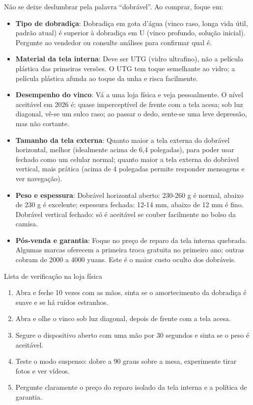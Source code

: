 
Não se deixe deslumbrar pela palavra “dobrável”. Ao comprar, foque em:

\begin{itemize}
  \item \textbf{Tipo de dobradiça}: Dobradiça em gota d'água (vinco raso, longa vida útil, padrão atual) é superior à dobradiça em U (vinco profundo, solução inicial). Pergunte ao vendedor ou consulte análises para confirmar qual é.
  \item \textbf{Material da tela interna}: Deve ser UTG (vidro ultrafino), não a película plástica das primeiras versões. O UTG tem toque semelhante ao vidro; a película plástica afunda ao toque da unha e risca facilmente.
  \item \textbf{Desempenho do vinco}: Vá a uma loja física e veja pessoalmente. O nível aceitável em 2026 é: quase imperceptível de frente com a tela acesa; sob luz diagonal, vê-se um sulco raso; ao passar o dedo, sente-se uma leve depressão, mas não cortante.
  \item \textbf{Tamanho da tela externa}: Quanto maior a tela externa do dobrável horizontal, melhor (idealmente acima de 6,4 polegadas), para poder usar fechado como um celular normal; quanto maior a tela externa do dobrável vertical, mais prática (acima de 4 polegadas permite responder mensagens e ver navegação).
  \item \textbf{Peso e espessura}: Dobrável horizontal aberto: 230-260 g é normal, abaixo de 230 g é excelente; espessura fechada: 12-14 mm, abaixo de 12 mm é fino. Dobrável vertical fechado: só é aceitável se couber facilmente no bolso da camisa.
  \item \textbf{Pós-venda e garantia}: Foque no preço de reparo da tela interna quebrada. Algumas marcas oferecem a primeira troca gratuita no primeiro ano; outras cobram de 2000 a 4000 yuans. Este é o maior custo oculto dos dobráveis.
\end{itemize}

\begin{tcbpractice}{Lista de verificação na loja física}
\begin{enumerate}
  \item Abra e feche 10 vezes com as mãos, sinta se o amortecimento da dobradiça é suave e se há ruídos estranhos.
  \item Abra e olhe o vinco sob luz diagonal, depois de frente com a tela acesa.
  \item Segure o dispositivo aberto com uma mão por 30 segundos e sinta se o peso é aceitável.
  \item Teste o modo suspenso: dobre a 90 graus sobre a mesa, experimente tirar fotos e ver vídeos.
  \item Pergunte claramente o preço do reparo isolado da tela interna e a política de garantia.
\end{enumerate}

\end{tcbpractice}

